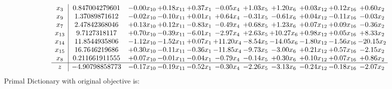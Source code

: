 \documentclass[9pt]{article}
\begin{document}
\[\begin{array}{c| c c@{\hskip 2pt} c@{\hskip 2pt} c@{\hskip 2pt} c@{\hskip 2pt} c@{\hskip 2pt} c@{\hskip 2pt} c@{\hskip 2pt} c@{\hskip 2pt} c@{\hskip 2pt} }
 x_{3}   &  0.847004279601 & -0.00 x_{10} & +  0.18 x_{11} & +  0.37 x_{1} & -0.05 x_{4} & +  1.03 x_{5} & +  1.20 x_{6} & +  0.03 x_{12} & +  0.12 x_{16} & +  0.60 x_{2}\\
 x_{9}   &  1.37089871612 & -0.02 x_{10} & -0.10 x_{11} & +  0.01 x_{1} & +  0.64 x_{4} & -0.31 x_{5} & -0.61 x_{6} & +  0.04 x_{12} & -0.11 x_{16} & -0.03 x_{2}\\
 x_{7}   &  2.47842368046 & +  0.13 x_{10} & +  0.12 x_{11} & -0.83 x_{1} & -0.49 x_{4} & +  0.68 x_{5} & +  1.23 x_{6} & +  0.07 x_{12} & +  0.09 x_{16} & -0.36 x_{2}\\
 x_{13}   &  9.7127318117 & +  0.70 x_{10} & -0.39 x_{11} & -6.01 x_{1} & -2.97 x_{4} & +  2.63 x_{5} & + 10.27 x_{6} & +  0.98 x_{12} & +  0.05 x_{16} & +  8.33 x_{2}\\
 x_{14}   &  11.8544935806 & -1.12 x_{10} & -1.52 x_{11} & +  0.07 x_{1} & + 11.20 x_{4} & -8.54 x_{5} & -14.05 x_{6} & -1.80 x_{12} & -1.56 x_{16} & -20.15 x_{2}\\
 x_{15}   &  16.7646219686 & +  0.30 x_{10} & -0.11 x_{11} & -0.36 x_{1} & -11.85 x_{4} & -9.73 x_{5} & -3.00 x_{6} & +  0.21 x_{12} & +  0.57 x_{16} & -2.15 x_{2}\\
 x_{8}   &  0.211661911555 & +  0.07 x_{10} & -0.01 x_{11} & -0.04 x_{1} & -0.79 x_{4} & -0.14 x_{5} & +  0.30 x_{6} & +  0.10 x_{12} & +  0.07 x_{16} & +  0.86 x_{2}\\
\hline
z    &  -4.90798858773 & -0.17 x_{10} & -0.19 x_{11} & -0.52 x_{1} & -0.30 x_{4} & -2.26 x_{5} & -3.13 x_{6} & -0.24 x_{12} & -0.18 x_{16} & -2.07 x_{2}\\
\end{array}\]
Primal Dictionary with original objective is:
\end{document}
